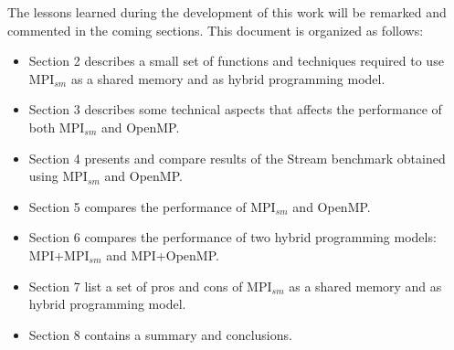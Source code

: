 \medskip

The lessons learned during the development of this work will be remarked and commented in the coming sections. This document is organized as follows:

\begin{itemize} 
\item Section 2 describes a small set of functions and techniques required to use MPI$_{sm}$ as a shared memory and as hybrid programming model.

\item Section 3 describes some technical aspects that affects the performance of both MPI$_{sm}$ and OpenMP.

\item Section 4 presents and compare results of the Stream benchmark obtained using MPI$_{sm}$ and OpenMP.

\item Section 5 compares the performance of MPI$_{sm}$ and OpenMP.

\item Section 6 compares the performance of two hybrid programming models: MPI+MPI$_{sm}$ and MPI+OpenMP.

\item Section 7 list a set of pros and cons of MPI$_{sm}$ as a shared memory and as hybrid programming model.

\item Section 8 contains a summary and conclusions.



\end{itemize}








